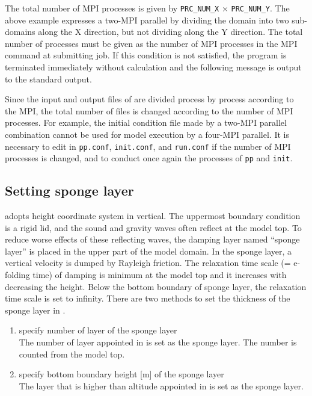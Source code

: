 The total number of MPI processes is given by \verb|PRC_NUM_X| $\times$ \verb|PRC_NUM_Y|.
The above example expresses a two-MPI parallel by dividing the domain into two sub-domains along the X direction, but not dividing along the Y direction. The total number of processes must be given as the number of MPI processes in the MPI command at submitting job.
If this condition is not satisfied,  the program is terminated immediately without calculation and the following message is output to the standard output.

Since the input and output files of \scalerm are divided process by process according to the MPI, the total number of files is changed according to the number of MPI processes.
For example, the initial condition file made by a two-MPI parallel combination cannot be used for model execution by a four-MPI parallel.
It is necessary to edit  in \verb|pp.conf|, \verb|init.conf|, and \verb|run.conf| if the number of MPI processes is changed,
and to conduct once again the processes of \verb|pp| and \verb|init|.


\subsection{Setting sponge layer} \label{subsec:raydamp}

\scalerm adopts height coordinate system in vertical. The uppermost boundary condition is a rigid lid, and the sound and gravity waves often reflect at the model top. To reduce worse effects of these reflecting waves, the damping layer named ``sponge layer'' is placed in the upper part of the model domain. In the sponge layer, a vertical velocity is dumped by Rayleigh friction. The relaxation time scale (= e-folding time) of damping is minimum at the model top and it increases with decreasing the height. Below the bottom boundary of sponge layer, the relaxation time scale is set to infinity.
There are two methods to set the thickness of the sponge layer in .

\begin{enumerate}
\item specify number of layer of the sponge layer \\
  The number of layer appointed in  is set as the sponge layer. The number is counted from the model top.
\item specify bottom boundary height [m] of the sponge layer \\
  The layer that is higher than altitude appointed in  is set as the sponge layer.
\end{enumerate}

